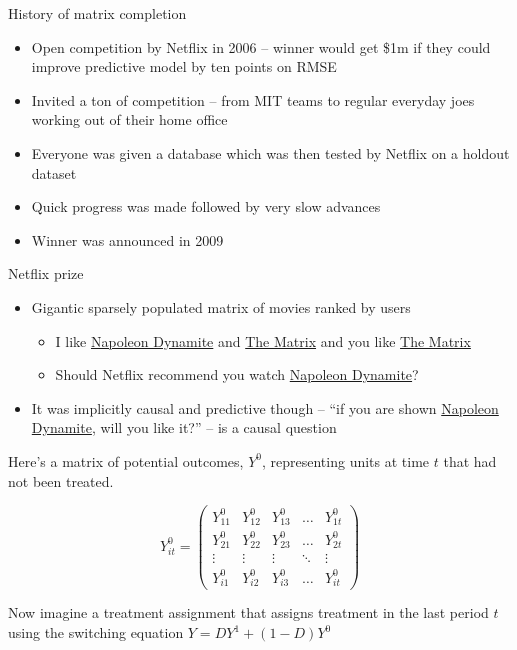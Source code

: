 \documentclass{beamer}
\begin{document}
\begin{frame}{History of matrix completion}

\begin{itemize}
\item Open competition by Netflix in 2006 -- winner would get \$1m if they could improve predictive model by ten points on RMSE
\item Invited a ton of competition -- from MIT teams to regular everyday joes working out of their home office
\item Everyone was given a database which was then tested by Netflix on a holdout dataset
\item Quick progress was made followed by very slow advances
\item Winner was announced in 2009
\end{itemize}

\end{frame}

\begin{frame}{Netflix prize}

\begin{itemize}
\item Gigantic sparsely populated matrix of movies ranked by users
	\begin{itemize}
	\item I like \underline{Napoleon Dynamite} and \underline{The Matrix} and you like \underline{The Matrix}
	\item Should Netflix recommend you watch \underline{Napoleon Dynamite}?
	\end{itemize}
\item It was implicitly causal and predictive though -- ``if you are shown \underline{Napoleon Dynamite}, will you like it?'' -- is a causal question
\end{itemize}

\end{frame}


\begin{frame}[plain]


Here's a matrix of potential outcomes, $Y^0$, representing units at time $t$ that had not been treated. 
\begin{center}
\[ Y^0_{it}  =\begin{pmatrix}
    Y^0_{11} & Y^0_{12} & Y^0_{13} & \dots  & Y^0_{1t} \\
    Y^0_{21} & Y^0_{22} & Y^0_{23} & \dots  & Y^0_{2t} \\
    \vdots & \vdots & \vdots & \ddots & \vdots \\
    Y^0_{i1} & Y^0_{i2} & Y^0_{i3} & \dots  & Y^0_{it}
\end{pmatrix}\]
\end{center}

Now imagine a treatment assignment that assigns treatment in the last period $t$ using the switching equation $Y=DY^1 + (1-D)Y^0$

\end{frame}
\end{document}
